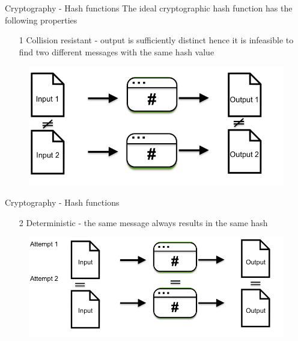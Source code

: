\documentclass[10pt]{beamer}
\begin{document}
\begin{frame}{Cryptography - Hash functions}
	The ideal cryptographic hash function has the following properties
	\begin{enumerate}
		\item[1] Collision resistant - output is sufficiently distinct hence it is infeasible to find two different messages with the same hash value
	\end{enumerate}
	\begin{figure}[]
		\centering
		\includegraphics  [scale=0.3]{Images/hash1}
		\begin{centering}
		\end{centering}
	\end{figure}
\end{frame}


\begin{frame}{Cryptography - Hash functions}
	\begin{enumerate}
		\item[2] Deterministic - the same message always results in the same hash
	\end{enumerate}
	\begin{figure}[]
		\centering
		\includegraphics  [scale=0.3]{Images/hash2}
		\begin{centering}
		\end{centering}
	\end{figure}
\end{frame}
\end{document}

